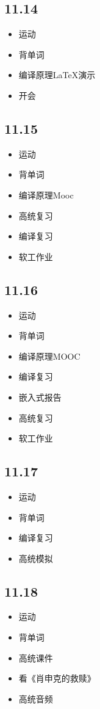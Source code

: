 \documentclass[UTF8]{ctexart}
\begin{document}
\subsection*{11.14}
\begin{itemize}
    \item 运动
    \item 背单词
    \item 编译原理LaTeX演示
    \item 开会
\end{itemize}

\subsection*{11.15}
\begin{itemize}
    \item 运动
    \item 背单词
    \item 编译原理Mooc
    \item 高统复习
    \item 编译复习
    \item 软工作业
\end{itemize}

\subsection*{11.16}
\begin{itemize}
    \item 运动
    \item 背单词
    \item 编译原理MOOC
    \item 编译复习
    \item 嵌入式报告
    \item 高统复习
    \item 软工作业
\end{itemize}

\subsection*{11.17}
\begin{itemize}
    \item 运动
    \item 背单词
    \item 编译复习
    \item 高统模拟
\end{itemize}

\subsection*{11.18}
\begin{itemize}
    \item 运动
    \item 背单词
    \item 高统课件
    \item 看《肖申克的救赎》
    \item 高统音频
\end{itemize}
\end{document}
